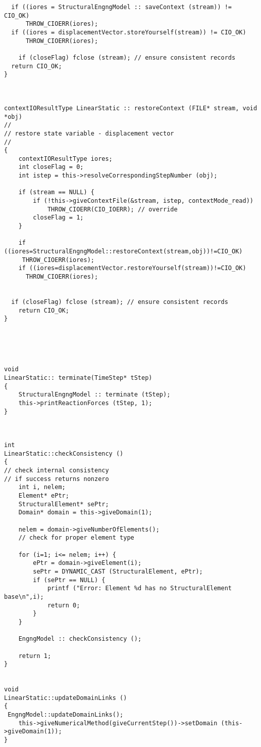 \documentclass[12pt,draft]{article}
\begin{document}
{\begin{verbatim}
  if ((iores = StructuralEngngModel :: saveContext (stream)) != CIO_OK) 
      THROW_CIOERR(iores);
  if ((iores = displacementVector.storeYourself(stream)) != CIO_OK) 
      THROW_CIOERR(iores);

	if (closeFlag) fclose (stream); // ensure consistent records
  return CIO_OK;
}



contextIOResultType LinearStatic :: restoreContext (FILE* stream, void *obj)
// 
// restore state variable - displacement vector
//
{
	contextIOResultType iores;
	int closeFlag = 0;
	int istep = this->resolveCorrespondingStepNumber (obj);

	if (stream == NULL) {
		if (!this->giveContextFile(&stream, istep, contextMode_read))
			THROW_CIOERR(CIO_IOERR); // override 
		closeFlag = 1;
	}

	if ((iores=StructuralEngngModel::restoreContext(stream,obj))!=CIO_OK)
     THROW_CIOERR(iores);
	if ((iores=displacementVector.restoreYourself(stream))!=CIO_OK)
      THROW_CIOERR(iores);

	
  if (closeFlag) fclose (stream); // ensure consistent records
	return CIO_OK;
}





void
LinearStatic:: terminate(TimeStep* tStep)
{
	StructuralEngngModel :: terminate (tStep);
	this->printReactionForces (tStep, 1);
}



int
LinearStatic::checkConsistency ()
{
// check internal consistency
// if success returns nonzero
	int i, nelem;
	Element* ePtr;
	StructuralElement* sePtr;
	Domain* domain = this->giveDomain(1);

	nelem = domain->giveNumberOfElements();
	// check for proper element type

	for (i=1; i<= nelem; i++) {
		ePtr = domain->giveElement(i);
		sePtr = DYNAMIC_CAST (StructuralElement, ePtr);
		if (sePtr == NULL) {
			printf ("Error: Element %d has no StructuralElement base\n",i);
			return 0;
		}
	}

	EngngModel :: checkConsistency ();

	return 1;
}


void
LinearStatic::updateDomainLinks ()
{
 EngngModel::updateDomainLinks();
	this->giveNumericalMethod(giveCurrentStep())->setDomain (this->giveDomain(1));
}
\end{verbatim}}
\end{document}
